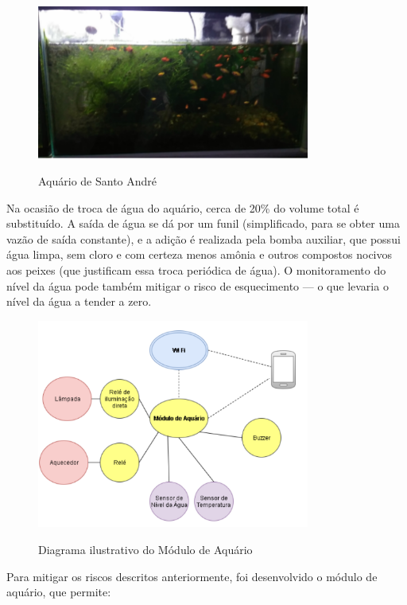 \begin{figure}[H]
	\centering
	\caption{Aquário de Santo André}
	\includegraphics[width=0.8\textwidth]{aquario}
	\label{fig:aquario}
\end{figure}

Na ocasião de troca de água do aquário, cerca de 20\% do volume total é substituído. A saída de água se dá por um funil (simplificado, para se obter uma vazão de saída constante), e a adição é realizada pela bomba auxiliar, que possui água limpa, sem cloro e com certeza menos amônia e outros compostos nocivos aos peixes (que justificam essa troca periódica de água). O monitoramento do nível da água pode também mitigar o risco de esquecimento --- o que levaria o nível da água a tender a zero.

\begin{figure}[H]
	\centering
	\caption{Diagrama ilustrativo do Módulo de Aquário}
	\includegraphics[width=0.8\textwidth]{diagramaAquario}
	\label{fig:diagramaAquario}
\end{figure}

Para mitigar os riscos descritos anteriormente, foi desenvolvido o módulo de aquário, que permite:

